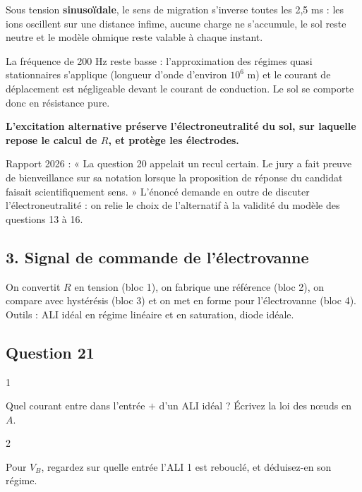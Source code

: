 \documentclass[11pt,a4paper]{article}
\begin{document}
Sous tension \textbf{sinusoïdale}, le sens de migration s'inverse toutes les 2,5 ms : les ions oscillent sur une distance infime, aucune charge ne s'accumule, le sol reste neutre et le modèle ohmique reste valable à chaque instant.

La fréquence de 200 Hz reste basse : l'approximation des régimes quasi stationnaires s'applique (longueur d'onde d'environ \(10^6\) m) et le courant de déplacement est négligeable devant le courant de conduction. Le sol se comporte donc en résistance pure.

\textbf{L'excitation alternative préserve l'électroneutralité du sol, sur laquelle repose le calcul de \(R\), et protège les électrodes.}

\begin{jury}

Rapport 2026 : « La question 20 appelait un recul certain. Le jury a fait preuve de bienveillance sur sa notation lorsque la proposition de réponse du candidat faisait scientifiquement sens. » L'énoncé demande en outre de discuter l'électroneutralité : on relie le choix de l'alternatif à la validité du modèle des questions 13 à 16.

\end{jury}

\hypertarget{signal-de-commande-de-luxe9lectrovanne}{%
\subsection{3. Signal de commande de l'électrovanne}\label{signal-de-commande-de-luxe9lectrovanne}}

On convertit \(R\) en tension (bloc 1), on fabrique une référence (bloc 2), on compare avec hystérésis (bloc 3) et on met en forme pour l'électrovanne (bloc 4). Outils : ALI idéal en régime linéaire et en saturation, diode idéale.

\hypertarget{question-21}{%
\subsection{Question 21}\label{question-21}}

\begin{indication}{1}

Quel courant entre dans l'entrée \(+\) d'un ALI idéal ? Écrivez la loi des nœuds en \(A\).

\end{indication}

\begin{indication}{2}

Pour \(V_B\), regardez sur quelle entrée l'ALI 1 est rebouclé, et déduisez-en son régime.

\end{indication}
\end{document}
